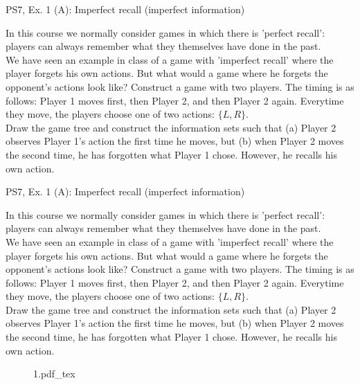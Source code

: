 \begin{frame}{PS7, Ex. 1 (A): Imperfect recall (imperfect information)}
  \begin{multicols}{2}
    In this course we normally consider games in which there is ’perfect recall’: players can always remember what they themselves have done in the past.\\\medskip
    We have seen an example in class of a game with ’imperfect recall’ where the player forgets his own actions. But what would a game where he forgets the opponent’s actions look like? Construct a game with two players. The timing is as follows: Player 1 moves first, then Player 2, and then Player 2 again. Everytime they move, the players choose one of two actions: $\{L, R\}$.\\\medskip
    Draw the game tree and construct the information sets such that (a) Player 2 observes Player 1’s action the first time he moves, but (b) when Player 2 moves the second time, he has forgotten what Player 1 chose. However, he recalls his own action.
    \vfill\null\columnbreak
    \vfill\null
  \end{multicols}
\end{frame}
\begin{frame}{PS7, Ex. 1 (A): Imperfect recall (imperfect information)}
  \begin{multicols}{2}
    In this course we normally consider games in which there is ’perfect recall’: players can always remember what they themselves have done in the past.\\\medskip
    We have seen an example in class of a game with ’imperfect recall’ where the player forgets his own actions. But what would a game where he forgets the opponent’s actions look like? Construct a game with two players. The timing is as follows: Player 1 moves first, then Player 2, and then Player 2 again. Everytime they move, the players choose one of two actions: $\{L, R\}$.\\\medskip
    Draw the game tree and construct the information sets such that (a) Player 2 observes Player 1’s action the first time he moves, but (b) when Player 2 moves the second time, he has forgotten what Player 1 chose. However, he recalls his own action.
    \vfill\null\columnbreak
    \vfill\null
    \begin{figure}[!h]
      \center
      \def\svgwidth{\columnwidth}
      {1.pdf_tex}
    \end{figure}
  \end{multicols}
\end{frame}



